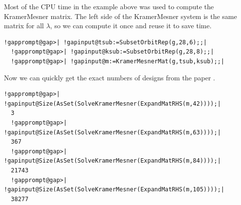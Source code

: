 \documentclass[a4paper,11pt]{report}
\begin{document}
{{{ Most of the CPU time in the example above was used to compute the
Kramer\texttt{}Mesner matrix. The left side of the
Kramer\texttt{}Mesner system is the same matrix for all $\lambda$, so we can compute it once and reuse it to save time. 
\begin{Verbatim}[commandchars=!@|,fontsize=\small,frame=single,label=Example]
  !gapprompt@gap>| !gapinput@tsub:=SubsetOrbitRep(g,28,6);;|
  !gapprompt@gap>| !gapinput@ksub:=SubsetOrbitRep(g,28,8);;|
  !gapprompt@gap>| !gapinput@m:=KramerMesnerMat(g,tsub,ksub);;|
\end{Verbatim}
 Now we can quickly get the exact numbers of designs from the paper \cite{BS93}. 
\begin{Verbatim}[commandchars=!@|,fontsize=\small,frame=single,label=Example]
  !gapprompt@gap>| !gapinput@Size(AsSet(SolveKramerMesner(ExpandMatRHS(m,42))));|
  3
  !gapprompt@gap>| !gapinput@Size(AsSet(SolveKramerMesner(ExpandMatRHS(m,63))));|
  367
  !gapprompt@gap>| !gapinput@Size(AsSet(SolveKramerMesner(ExpandMatRHS(m,84))));|
  21743
  !gapprompt@gap>| !gapinput@Size(AsSet(SolveKramerMesner(ExpandMatRHS(m,105))));|
  38277
\end{Verbatim}
 }

 
}}
\end{document}
